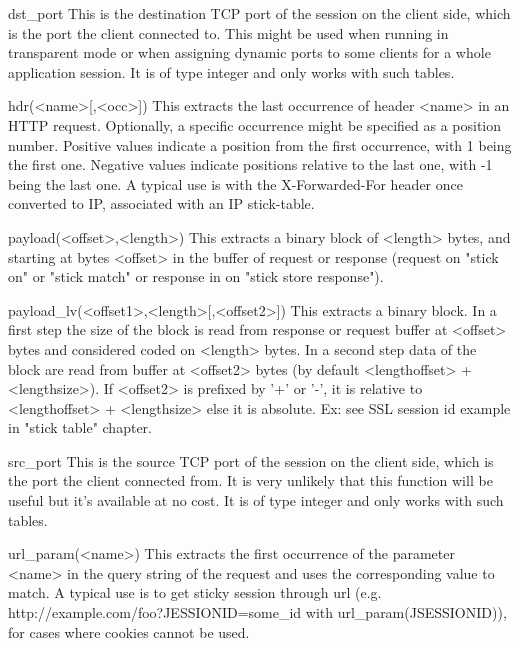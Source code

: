   dst_port     This is the destination TCP port of the session on the client
               side, which is the port the client connected to. This might be
               used when running in transparent mode or when assigning dynamic
               ports to some clients for a whole application session. It is of
               type integer and only works with such tables.

  hdr(<name>[,<occ>])
               This extracts the last occurrence of header <name> in an HTTP
               request. Optionally, a specific occurrence might be specified as
               a position number. Positive values indicate a position from the
               first occurrence, with 1 being the first one. Negative values
               indicate positions relative to the last one, with -1 being the
               last one. A typical use is with the X-Forwarded-For header once
               converted to IP, associated with an IP stick-table.

  payload(<offset>,<length>)
               This extracts a binary block of <length> bytes, and starting
               at bytes <offset> in the buffer of request or response (request
               on "stick on" or "stick match" or response in on "stick store
               response").

  payload_lv(<offset1>,<length>[,<offset2>])
               This extracts a binary block. In a first step the size of the
               block is read from response or request buffer at <offset>
               bytes and considered coded on <length> bytes. In a second step
               data of the block are read from buffer at <offset2> bytes
               (by default <lengthoffset> + <lengthsize>).
               If <offset2> is prefixed by '+' or '-', it is relative to
               <lengthoffset> + <lengthsize> else it is absolute.
               Ex: see SSL session id  example in "stick table" chapter.

  src_port     This is the source TCP port of the session on the client side,
               which is the port the client connected from. It is very unlikely
               that this function will be useful but it's available at no cost.
               It is of type integer and only works with such tables.

  url_param(<name>)
               This extracts the first occurrence of the parameter <name> in
               the query string of the request and uses the corresponding value
               to match. A typical use is to get sticky session through url
               (e.g. http://example.com/foo?JESSIONID=some_id with
               url_param(JSESSIONID)), for cases where cookies cannot be used.

